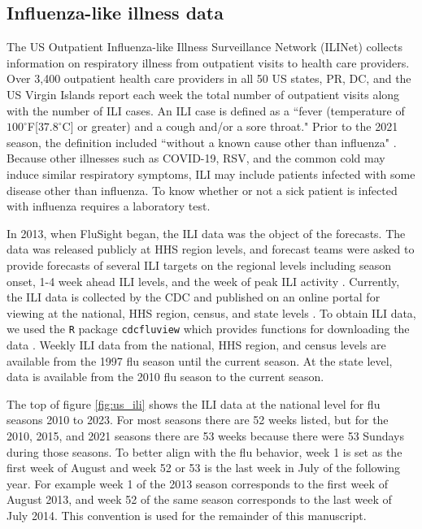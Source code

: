 \subsection{Influenza-like illness data}
The US Outpatient Influenza-like Illness Surveillance Network (ILINet) collects 
information on respiratory illness from outpatient visits to health care 
providers. Over 3,400 outpatient health care providers in all 50 US states, PR, 
DC, and the US Virgin Islands report each week the total number of outpatient 
visits along with the number of ILI cases. An ILI case is defined as a 
``fever (temperature of $100^{\circ}$F[$37.8^{\circ}$C] or greater) and a cough 
and/or a sore throat." Prior to the 2021 season, the definition included 
``without a known cause other than influenza" \cite[]{cdcfluview2023}. Because 
other illnesses such as COVID-19, RSV, and the common cold may induce similar 
respiratory symptoms, ILI may include patients infected with some disease 
other than influenza. To know whether or not a sick patient is infected with 
influenza requires a laboratory test. 

In 2013, when FluSight began, the ILI data was the object of the forecasts. 
The data was released publicly at HHS region levels, and forecast teams were 
asked to provide forecasts of several ILI targets on the regional levels 
including season onset, 1-4 week ahead ILI levels, and the week of peak ILI 
activity \cite[]{biggerstaff2016results,mcgowan2019collaborative}. Currently, 
the ILI data is collected by the CDC and published on an online portal for 
viewing at the national, HHS region, census, and state levels 
\cite[]{cdc2024fluviewportal}. To obtain ILI data, we used the \texttt{R} 
package \texttt{cdcfluview} which provides functions for downloading the data 
\cite[]{rudis2021cdcfluview}. Weekly ILI data from the national, HHS region, 
and census levels are available from the 1997 flu season until the current 
season. At the state level, data is available from the 2010 flu season to the 
current season. 

The top of figure \ref{fig:us_ili} shows the ILI data at the national level for 
flu seasons 2010 to 2023. For most seasons there are 52 weeks listed, but for 
the 2010, 2015, and 2021 seasons there are 53 weeks because there were 53 
Sundays during those seasons. 
To better align with the flu behavior, week 1 is set as the first week of 
August and week 52 or 53 is the last week in July of the following year. For 
example week 1 of the 2013 season corresponds to the first week of August 2013, 
and week 52 of the same season corresponds to the last week of July 2014. This 
convention is used for the remainder of this manuscript. 


